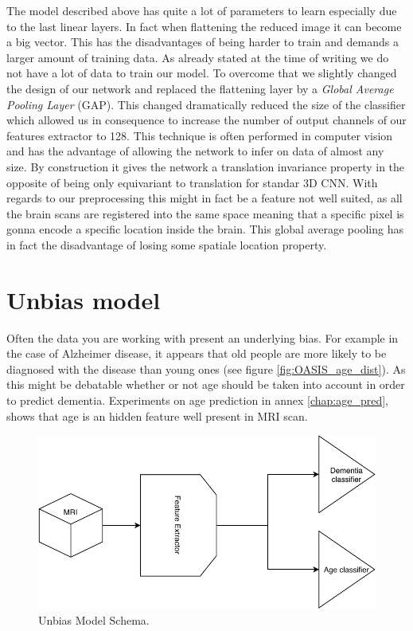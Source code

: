 The model described above has quite a lot of parameters to learn especially due to the last linear layers. In fact when flattening the reduced image it can become a big vector. This has the disadvantages of being harder to train and demands a larger amount of training data. As already stated at the time of writing we do not have a lot of data to train our model. 
To overcome that we slightly changed the design of our network and replaced the flattening layer by a \textit{Global Average Pooling Layer}\cite{GAP_lin2013network} (GAP). This changed dramatically reduced the size of the classifier which allowed us in consequence to increase the number of output channels of our features extractor to 128.  
This technique is often performed in computer vision and has the advantage of allowing the network to infer on data of almost any size. By construction it gives the network a translation invariance property in the opposite of being only equivariant to translation for standar 3D CNN.
With regards to our preprocessing this might in fact be a feature not well suited, as all the brain scans are registered into the same space meaning that a specific pixel is gonna encode a specific location inside the brain. This global average pooling has in fact the disadvantage of losing some spatiale location property. 


\section{Unbias model}
\label{sec:unbias_model}

Often the data you are working with present an underlying bias. For example in the case of Alzheimer disease, it appears that old people are more likely to be diagnosed with the disease than young ones (see figure \ref{fig:OASIS_age_dist}). As this might be debatable whether or not age should be taken into account in order to predict dementia. Experiments on age prediction in annex \ref{chap:age_pred}, shows that age is an hidden feature well present in MRI scan.

\begin{figure}
 \centering
 \includegraphics[width=.9\linewidth]{figures/models/Unbias_model.pdf}
 \captionsetup{width=.9\linewidth}
 \caption[UnbiasModelSchema]{Unbias Model Schema.}
 \label{fig:unbias_model_schema}
\end{figure}

